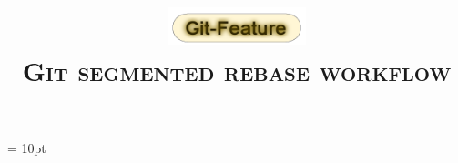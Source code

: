 \documentclass[10pt,a4paper]{article}          %
\title{
\begin{Titre}
\includegraphics[width=4cm]{imgbin/logo.png}\\                %
\textsc{\textbf{Git segmented rebase workflow}} \\   %
\end{Titre}
}
\author{}
\date{}%
\begin{document}
\maketitle			%

\renewcommand{\labelitemi}{\ding{226}}  %
\newcommand{\DEVREF}{\texttt{DEVREF}}



\tableofcontents	%

\parskip = 10pt
\pagestyle{fancy}




\end{document}
